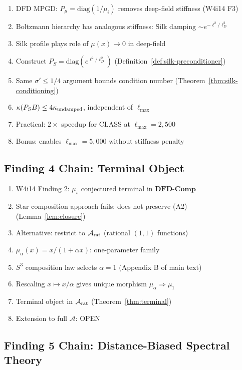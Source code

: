 \documentclass[11pt]{article}
\theoremstyle{definition}
\theoremstyle{remark}
\begin{document}
\begin{enumerate}[nosep]
\item DFD MPGD: $P_\mu = \text{diag}(1/\mu_i)$ removes deep-field stiffness (W4i14 F3)
\item Boltzmann hierarchy has analogous stiffness: Silk damping $\sim e^{-\ell^2/\ell_D^2}$
\item Silk profile plays role of $\mu(x) \to 0$ in deep-field
\item Construct $P_S = \text{diag}(e^{\ell^2/\ell_D^2})$ (Definition~\ref{def:silk-preconditioner})
\item Same $\sigma' \leq 1/4$ argument bounds condition number (Theorem~\ref{thm:silk-conditioning})
\item $\kappa(P_S B) \leq 4\kappa_{\rm undamped}$, independent of $\ell_{\max}$
\item Practical: $2\times$ speedup for CLASS at $\ell_{\max} = 2{,}500$
\item Bonus: enables $\ell_{\max} = 5{,}000$ without stiffness penalty
\end{enumerate}

\subsection{Finding 4 Chain: Terminal Object}

\begin{enumerate}[nosep]
\item W4i14 Finding 2: $\mu_s$ conjectured terminal in $\mathbf{DFD\text{-}Comp}$
\item Star composition approach fails: does not preserve (A2) (Lemma~\ref{lem:closure})
\item Alternative: restrict to $\mathcal{A}_{\rm rat}$ (rational $(1,1)$ functions)
\item $\mu_\alpha(x) = x/(1+\alpha x)$: one-parameter family
\item $S^3$ composition law selects $\alpha = 1$ (Appendix B of main text)
\item Rescaling $x \mapsto x/\alpha$ gives unique morphism $\mu_\alpha \Rightarrow \mu_1$
\item Terminal object in $\mathcal{A}_{\rm rat}$ (Theorem~\ref{thm:terminal})
\item Extension to full $\mathcal{A}$: OPEN
\end{enumerate}

\subsection{Finding 5 Chain: Distance-Biased Spectral Theory}
\end{document}
